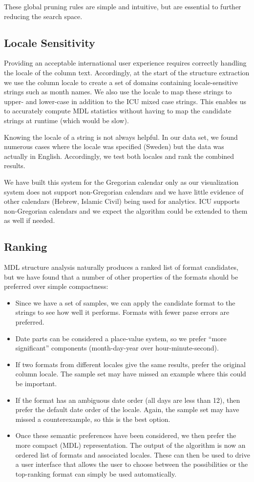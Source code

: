 These global pruning rules are simple and intuitive, but are essential to further reducing the search space.

\subsection{Locale Sensitivity}
Providing an acceptable international user experience requires correctly handling the locale of the column text. Accordingly, at the start of the structure extraction we use the column locale to create a set of domains containing locale-sensitive strings such as month names. We also use the locale to map these strings to upper- and lower-case in addition to the ICU mixed case strings. This enables us to accurately compute MDL statistics without having to map the candidate strings at runtime (which would be slow).

Knowing the locale of a string is not always helpful. In our data set, we found numerous cases where the locale was specified (\eg Sweden) but the data was actually in English. Accordingly, we test both locales and rank the combined results. 

We have built this system for the Gregorian calendar only as our visualization system does not support non-Gregorian calendars and we have little evidence of other calendars (\eg Hebrew, Islamic Civil) being used for analytics. ICU supports non-Gregorian calendars and we expect the algorithm could be extended to them as well if needed.

\subsection{Ranking}
MDL structure analysis naturally produces a ranked list of format candidates, but we have found that a number of other properties of the formats should be preferred over simple compactness:
\begin{itemize}
\item Since we have a set of samples, we can apply the candidate format to the strings to see how well it performs. Formats with fewer parse errors are preferred.
\item Date parts can be considered a place-value system, so we prefer ``more significant'' components (\eg month-day-year over hour-minute-second).
\item If two formats from different locales give the same results, prefer the original column locale. The sample set may have missed an example where this could be important.
\item If the format has an ambiguous date order (\eg all days are less than 12), then prefer the default date order of the locale. Again, the sample set may have missed a counterexample, so this is the best option.
\item Once these semantic preferences have been considered, we then prefer the more compact (MDL) representation.
The output of the algorithm is now an ordered list of formats and associated locales. These can then be used to drive a user interface that allows the user to choose between the possibilities or the top-ranking format can simply be used automatically.
\end{itemize}